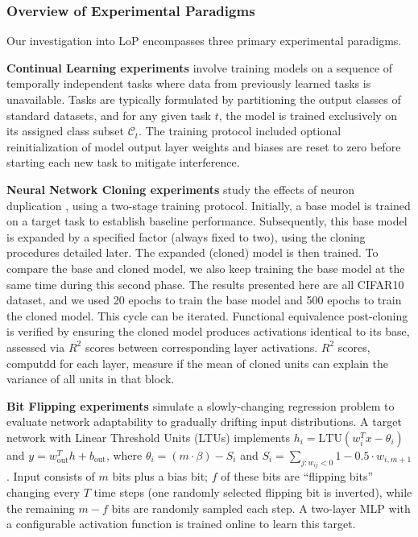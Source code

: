 \documentclass{article}
\newcommand{\ff}[1]{\todo[color=blue!30,size=\tiny]{FF: #1}}
\numberwithin{figure}{section}
\begin{document}
\subsubsection{Overview of Experimental Paradigms}
\label{subsec:experiment_paradigms}

Our investigation into LoP encompasses three primary experimental paradigms.

\textbf{Continual Learning experiments} involve training models on a sequence of temporally independent tasks where data from previously learned tasks is unavailable. Tasks are typically formulated by partitioning the output classes of standard datasets, and for any given task $t$, the model is trained exclusively on its assigned class subset $\mathcal{C}_t$. The training protocol included optional reinitialization of model output layer weights and biases are reset to zero before starting each new task to mitigate interference.

\textbf{Neural Network Cloning experiments} study the effects of neuron duplication , using a two-stage training protocol. Initially, a base model is trained on a target task to establish baseline performance. Subsequently, this base model is expanded by a specified factor (always fixed to two), using the cloning procedures detailed later.  The expanded (cloned) model is then trained. To compare the base and cloned model, we also keep training the base model at the same time during this second phase. The results presented here are all CIFAR10 dataset, and we used 20 epochs to train the base model and 500 epochs to train the cloned model. This cycle can be iterated. Functional equivalence post-cloning is verified by ensuring the cloned model produces activations identical to its base, assessed via $R^2$ scores between corresponding layer activations. $R^2$ scores, computdd for each layer, measure if the mean of cloned units can explain the variance of all units in that block. 

\textbf{Bit Flipping experiments} simulate a slowly-changing regression problem to evaluate network adaptability to gradually drifting input distributions. A target network with Linear Threshold Units (LTUs) implements $h_i = \text{LTU}(w_i^T x - \theta_i)$ and $y = w_{\text{out}}^T h + b_{\text{out}}$, where $\theta_i = (m \cdot \beta) - S_i$ and $S_i = \sum_{j: w_{ij} < 0} 1 - 0.5 \cdot w_{i,m+1}$. Input consists of $m$ bits plus a bias bit; $f$ of these bits are ``flipping bits'' changing every $T$ time steps (one randomly selected flipping bit is inverted), while the remaining $m-f$ bits are randomly sampled each step. A two-layer MLP with a configurable activation function is trained online to learn this target.\ff{define LTU operation}
\end{document}
